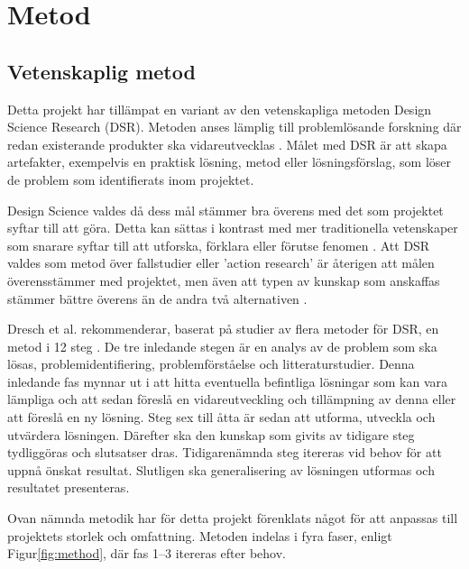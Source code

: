 \section{Metod} %
\label{sec:metod}
    
    \subsection{Vetenskaplig metod} %
    \label{sub:vetenskaplig_metod}
    	Detta projekt har tillämpat en variant av den vetenskapliga metoden Design Science Research (DSR). Metoden anses lämplig till problemlösande forskning där redan existerande produkter ska vidareutvecklas \cite{dsr}. Målet med DSR är att skapa artefakter, exempelvis en praktisk lösning, metod eller lösningsförslag, som löser de problem som identifierats inom projektet. \bigskip

        Design Science valdes då dess mål stämmer bra överens med det som projektet syftar till att göra. Detta kan sättas i kontrast med mer traditionella vetenskaper som snarare syftar till att utforska, förklara eller förutse fenomen \cite[s.~13]{dsr}. Att DSR valdes som metod över fallstudier eller 'action research' är återigen att målen överensstämmer med projektet, men även att typen av kunskap som anskaffas stämmer bättre överens än de andra två alternativen \cite[s.~95]{dsr}.\bigskip

    	Dresch et al. rekommenderar, baserat på studier av flera metoder för DSR, en metod i 12 steg \cite[s.~118--126]{dsr}. De tre inledande stegen är en analys av de problem som ska lösas, problemidentifiering, problemförståelse och litteraturstudier. Denna inledande fas mynnar ut i att hitta eventuella befintliga lösningar som kan vara lämpliga och att sedan föreslå en vidareutveckling och tillämpning av denna eller att föreslå en ny lösning. Steg sex till åtta är sedan att utforma, utveckla och utvärdera lösningen. Därefter ska den kunskap som givits av tidigare steg tydliggöras och slutsatser dras. Tidigarenämnda steg itereras vid behov för att uppnå önskat resultat. Slutligen ska generalisering av lösningen utformas och resultatet presenteras. \bigskip

    	Ovan nämnda metodik har för detta projekt förenklats något för att anpassas till projektets storlek och omfattning. Metoden indelas i fyra faser, enligt Figur\ref{fig:method}, där fas 1--3 itereras efter behov.

